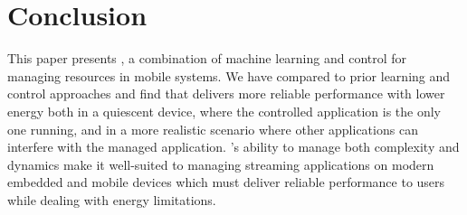 \section{Conclusion}
This paper presents \SYSTEM{}, a combination of machine learning and
control for managing resources in mobile systems.  We have compared
\SYSTEM{} to prior learning and control approaches and find that
\SYSTEM{} delivers more reliable performance with lower energy both in
a quiescent device, where the controlled application is the only one
running, and in a more realistic scenario where other applications can
interfere with the managed application.  \SYSTEM{}'s ability to manage
both complexity and dynamics make it well-suited to managing streaming
applications on modern embedded and mobile devices which must deliver
reliable performance to users while dealing with energy limitations.
